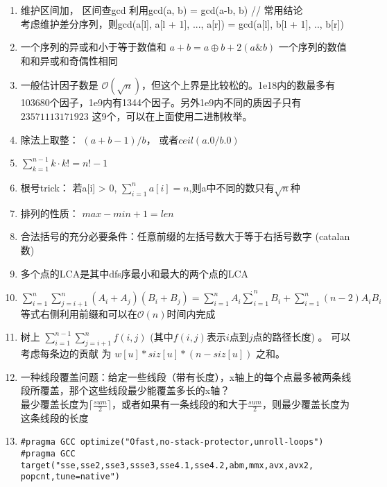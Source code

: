 \documentclass[a4paper]{ctexart}
\begin{document}
\begin{enumerate}
	\item 维护区间加， 区间查gcd
	利用gcd(a, b) = gcd(a-b, b)  // 常用结论 \\
	考虑维护差分序列，则gcd(a[l], a[l + 1], ..., a[r]) = gcd(a[l], b[l + 1], .., b[r])
	\item
	  \subitem 一个序列的异或和小于等于数值和 $a+b=a \oplus b+2(a \& b)$
	  \subitem 一个序列的数值和和异或和奇偶性相同

	\item 一般估计因子数是 $\mathcal{O}(\sqrt{n})$，但这个上界是比较松的。1e18内的数最多有103680个因子，1e9内有1344个因子。另外1e9内不同的质因子只有 $2 3 5 7 11 13 17 19 23$ 这9个，可以在上面使用二进制枚举。

	\item 除法上取整： $(a + b - 1) / b$， 或者$ceil(a.0 / b.0)$
	\item $\sum_{k=1}^{n-1}{k \cdot k!} = n! - 1$
	\item 根号trick：
	若a[i] > 0, $\sum_{i=1}^{n} a[i] = n$,则a中不同的数只有$\sqrt{n}$种
	\item 排列的性质： $ max - min + 1 = len $
	\item 合法括号的充分必要条件：任意前缀的左括号数大于等于右括号数字 (catalan数)
	\item 多个点的LCA是其中dfs序最小和最大的两个点的LCA
	\item $\sum_{i = 1}^{n}\sum_{j = i + 1}^{n}(A_i + A_j)(B_i + B_j) = \sum_{i = 1}^{n}A_i \dot \sum_{i = 1}^{n}B_i + \sum_{i = 1}^{n}(n - 2)A_i B_i$等式右侧利用前缀和可以在$\mathcal{O}(n)$时间内完成
	\item 树上 $\sum_{i=1}^{n-1}\sum_{j=i+1}^{n}f(i, j) $ (其中$f(i, j)$表示$i$点到$j$点的路径长度) 。 可以考虑每条边的贡献 为 $w[u] * siz[u] * (n - siz[u])$ 之和。
	\item 一种线段覆盖问题：给定一些线段（带有长度），x轴上的每个点最多被两条线段所覆盖，那个这些线段最少能覆盖多长的x轴？\\
	最少覆盖长度为$\lceil \frac{sum}{2} \rceil $，或者如果有一条线段的和大于$\frac{sum}{2}$，则最少覆盖长度为这条线段的长度
	\item 
	\begin{verbatim}
#pragma GCC optimize("Ofast,no-stack-protector,unroll-loops")
#pragma GCC target("sse,sse2,sse3,ssse3,sse4.1,sse4.2,abm,mmx,avx,avx2,
popcnt,tune=native")
	\end{verbatim}

	
\end{enumerate}
\end{document}

